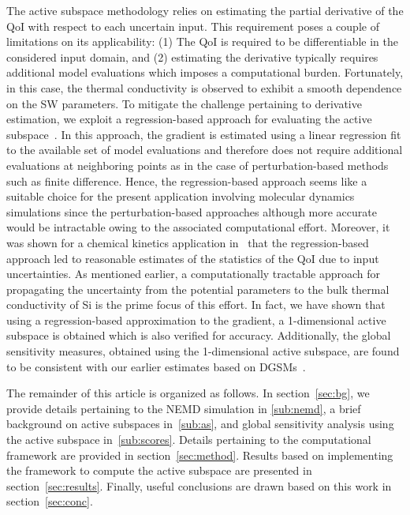 The active subspace methodology relies on estimating the partial derivative of the QoI 
with respect to each uncertain input. This requirement poses a couple of limitations on its
applicability: (1) The QoI is required to be differentiable in the considered input domain, and (2)
estimating the derivative typically requires additional model evaluations which
imposes a computational burden. Fortunately, in this case,
the thermal conductivity is observed to exhibit a smooth dependence on the SW parameters. 
To mitigate the challenge pertaining to derivative estimation, we exploit 
a regression-based approach for evaluating the active subspace~\cite{Vohra:2018c}. 
In this approach, the gradient is estimated
using a linear regression fit to the available set of model evaluations and therefore does not 
require additional evaluations at neighboring points as in the case of perturbation-based
methods such as finite difference. Hence, the regression-based approach seems like a suitable 
choice for the present application involving molecular dynamics simulations since the
perturbation-based approaches although more accurate would be intractable owing to the
associated computational effort. Moreover, it was shown for a chemical kinetics application
in~\cite{Vohra:2018c} that the regression-based approach led to reasonable estimates of
 the statistics of the QoI due to input uncertainties.
As mentioned earlier, a computationally tractable approach for propagating the uncertainty
from the potential parameters to the bulk thermal conductivity of Si is the prime focus of this  
effort. In fact, we have
shown that using a regression-based approximation to the gradient, a 1-dimensional
active subspace is obtained which is also verified for accuracy. Additionally, the global 
sensitivity measures, obtained using the 1-dimensional active subspace, are found to be consistent with 
our earlier estimates based on DGSMs~\cite{Vohra:2018b}. 

The remainder of this article is organized as follows. In section~\ref{sec:bg}, we provide details
pertaining to the NEMD simulation in \ref{sub:nemd}, a brief background on active subspaces
in~\ref{sub:as}, and global sensitivity analysis using the active subspace 
in~\ref{sub:scores}. 
Details pertaining to the computational framework are
provided in section~\ref{sec:method}. Results based on implementing the framework to
compute the active subspace
are presented in section~\ref{sec:results}. Finally, useful conclusions are drawn based on this
work in section~\ref{sec:conc}.

































